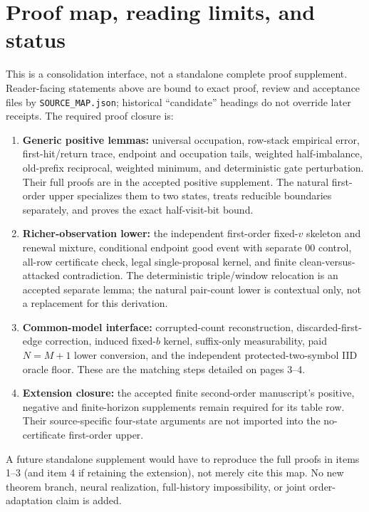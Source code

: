 \documentclass[10pt]{article}
\begin{document}
\section{Proof map, reading limits, and status}
This is a consolidation interface, not a standalone complete proof supplement. Reader-facing statements above are bound to exact proof, review and acceptance files by \texttt{SOURCE\_MAP.json}; historical ``candidate'' headings do not override later receipts. The required proof closure is:
\begin{enumerate}
\item \textbf{Generic positive lemmas:} universal occupation, row-stack empirical error, first-hit/return trace, endpoint and occupation tails, weighted half-imbalance, old-prefix reciprocal, weighted minimum, and deterministic gate perturbation. Their full proofs are in the accepted positive supplement. The natural first-order upper specializes them to two states, treats reducible boundaries separately, and proves the exact half-visit-bit bound.
\item \textbf{Richer-observation lower:} the independent first-order fixed-$v$ skeleton and renewal mixture, conditional endpoint good event with separate $00$ control, all-row certificate check, legal single-proposal kernel, and finite clean-versus-attacked contradiction. The deterministic triple/window relocation is an accepted separate lemma; the natural pair-count lower is contextual only, not a replacement for this derivation.
\item \textbf{Common-model interface:} corrupted-count reconstruction, discarded-first-edge correction, induced fixed-$b$ kernel, suffix-only measurability, paid $N=M+1$ lower conversion, and the independent protected-two-symbol IID oracle floor. These are the matching steps detailed on pages 3--4.
\item \textbf{Extension closure:} the accepted finite second-order manuscript's positive, negative and finite-horizon supplements remain required for its table row. Their source-specific four-state arguments are not imported into the no-certificate first-order upper.
\end{enumerate}
A future standalone supplement would have to reproduce the full proofs in items 1--3 (and item 4 if retaining the extension), not merely cite this map. No new theorem branch, neural realization, full-history impossibility, or joint order-adaptation claim is added.
\end{document}
